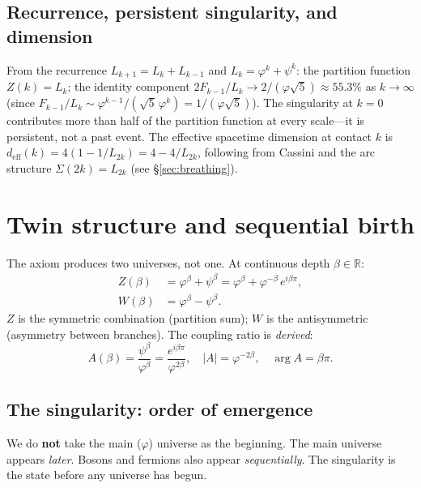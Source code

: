 \documentclass[12pt,a4paper]{article}
\begin{document}
\subsection{Recurrence, persistent singularity, and dimension}
From the recurrence $L_{k+1} = L_k + L_{k-1}$ and $L_k = \varphi^k + \psi^k$: the partition function $Z(k) = L_k$; the identity component $2F_{k-1}/L_k \to 2/(\varphi\sqrt{5}) \approx 55.3\%$ as $k\to\infty$ (since $F_{k-1}/L_k \sim \varphi^{k-1}/(\sqrt{5}\,\varphi^k) = 1/(\varphi\sqrt{5})$). The singularity at $k=0$ contributes more than half of the partition function at every scale---it is persistent, not a past event. The effective spacetime dimension at contact $k$ is $d_{\mathrm{eff}}(k) = 4(1 - 1/L_{2k}) = 4 - 4/L_{2k}$, following from Cassini and the arc structure $\Sigma(2k) = L_{2k}$ (see \S\ref{sec:breathing}).

\section{Twin structure and sequential birth}
\label{sec:twin-structure}

The axiom produces two universes, not one. At continuous depth $\beta \in \mathbb{R}$:
\begin{align}
Z(\beta) &= \varphi^\beta + \psi^\beta = \varphi^\beta + \varphi^{-\beta}\,e^{i\beta\pi}, \label{eq:Z}\\
W(\beta) &= \varphi^\beta - \psi^\beta.
\end{align}
$Z$ is the symmetric combination (partition sum); $W$ is the antisymmetric (asymmetry between branches). The coupling ratio is \emph{derived}:
\begin{equation}
A(\beta) = \frac{\psi^\beta}{\varphi^\beta} = \frac{e^{i\beta\pi}}{\varphi^{2\beta}}, \quad |A| = \varphi^{-2\beta}, \quad \arg A = \beta\pi.
\end{equation}
\label{def:twin-structure}

\subsection{The singularity: order of emergence}
\label{subsec:singularity}
\label{sec:singularity-persistent}

We do \textbf{not} take the main ($\varphi$) universe as the beginning. The main universe appears \emph{later}. Bosons and fermions also appear \emph{sequentially}. The singularity is the state before any universe has begun.
\end{document}
